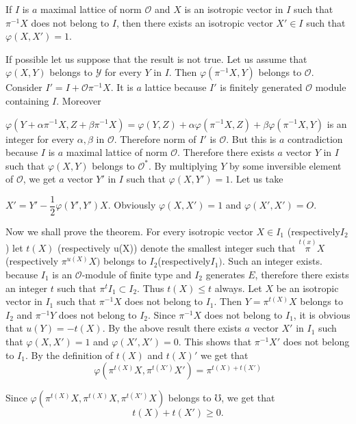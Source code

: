 If $I$ is $a$ maximal lattice of norm $\mathscr{O}$ and $X$ is an 
isotropic vector in $I$ such that $\pi^{-1} X$ does not belong to $I$,
then there exists an isotropic vector $X' \in I $ such that $
\varphi(X,X')=1$. 

If possible let us suppose that the result is not true. Let us assume
that $ \varphi(X,Y)$ belongs to $\mathscr{Y} $ for every $Y$ in
$I$. Then $\varphi (\pi^{-1}X,Y)$ belongs to
$\mathscr{O}$. Consider $I'= I + \mathscr{O} {\pi^{-1}} X$. It
is $a$  lattice because $I'$ is finitely generated $\mathscr{O} $
module containing $I$. Moreover 

$ \varphi (Y+ \alpha  {\pi^{-1}} X,Z + \beta
{\pi^{-1}}X) = \varphi(Y,Z) + \alpha \varphi ({\pi^{-1}} X,Z) +
\beta \varphi ({\pi^{-1}}X,Y)$  is an integer for every
$\alpha ,  \beta $ in $ \mathscr{O} $.  Therefore norm of $I'$ is
$\mathscr{O}$. But   this is $a$  contradiction because $I$ is $a$
maximal lattice of norm $\mathscr{O}$. Therefore there exists $a$
vector $Y$ in $I$ such that $\varphi(X,Y) $ belongs to $\mathscr{O}^\ast
$. By multiplying $Y$ by some inversible element of $\mathscr{O} $, we
get $a$ vector $Y'$ in $I$ such  that $\varphi (X,Y')= 1$. Let us
take 

$X'=Y' - \dfrac {1}{2} \varphi (Y', Y' ) X$. Obviously $\varphi (X,X')
= 1$ and  $\varphi (X', X')=O$. 

Now we shall prove the theorem. For every isotropic vector $X \in
I_1$
(respectively\pageoriginale $I_2$) let $t(X)$  (respectively u(X)) denote the smallest
integer such that $\overset{t(x)}{\pi}X$ (respectively $ \pi
^{u(X)}X)$  belongs to $ I_2$(respectively$ I_1)$. Such an integer
exists.  because $I_1$ is an $\mathscr{O}$-module  of finite
type and $I_2$ generates $E$,  therefore there exists an integer $t$
such that $ \pi^t I_1 \subset I _2$. Thus $t(X) \leq t$ always. Let
$X$ be an isotropic vector in $I_1$ such that $ \pi ^{-1} X$  does not
belong to $I_1$. Then	$ Y= \pi^{t(X)} X $ belongs to $I_2$ and $ \pi
^{-1}Y $ does not belong to $I_2$. Since $\pi^{-1} X $ does not
belong to $I_1$, it is obvious that $u(Y)= -t(X)$. By the above result
there exists $a$ vector $X'$  in $I_1$ such that $ \varphi(X,X')=1$
and $\varphi(X',X')=0$. This shows that $\pi ^{-1}X'$ does not  belong
to $I_1$. By the definition of $t(X)$ and $t(X)'$ we get that 
$$
\varphi \left(\pi^{t (X)} X, \pi^{t(X')}X'\right)= \pi^{t(X)+t(X')}
$$ 

Since  $ \varphi (\pi^{t(X)}X, \pi^{t(X)}X, \pi^{t(X')}X)$ belongs
to $ \mho$, we get that  
\begin{equation*}
  t (X) + t(X') \ge 0. \tag{1}
\end{equation*}

